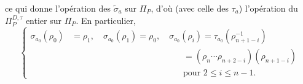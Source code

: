 ce qui donne l'opération des $\widetilde\sigma_a$ sur $\Pi_P$,  d'où   (avec celle des $\tau_a$) l'opération du $\Pi_P^{D,\tau}$ entier sur $\Pi_P$.  En particulier,
\[
\left\{
\begin{aligned}
\sigma_{a_0}(\rho_0)&=\rho_1,\quad
\sigma_{a_0}(\rho_1)=\rho_0,\quad
\sigma_{a_0}(\rho_i)=\tau_{a_0}(\rho_{n+1-i}^{-1})\\
&\hspace{13em}=(\rho_n\cdots\rho_{n+2-i})(\rho_{n+1-i})\\
&\hspace{13em}\text{pour }2\leq i\leq n-1.
\end{aligned}
\right.
\]

